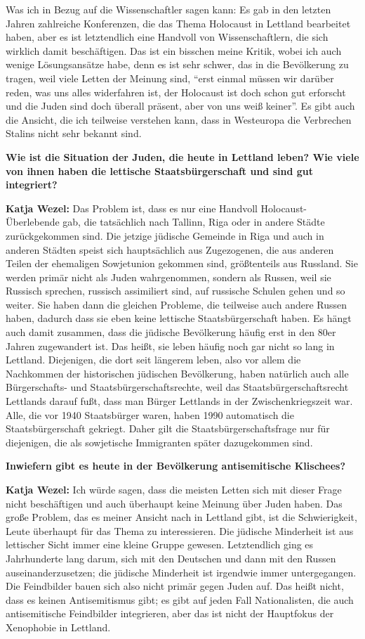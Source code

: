 Was ich in Bezug auf die Wissenschaftler sagen kann: Es gab in den letzten Jahren zahlreiche Konferenzen, die das Thema Holocaust in Lettland bearbeitet haben, aber es ist letztendlich eine Handvoll von Wissenschaftlern, die sich wirklich damit beschäftigen. Das ist ein bisschen meine Kritik, wobei ich auch wenige Lösungsansätze habe, denn es ist sehr schwer, das in die Bevölkerung zu tragen, weil viele Letten der Meinung sind, ``erst einmal müssen wir darüber reden, was uns alles widerfahren ist, der Holocaust ist doch schon gut erforscht und die Juden sind doch überall präsent, aber von uns weiß keiner''. Es gibt auch die Ansicht, die ich teilweise verstehen kann, dass in Westeuropa die Verbrechen Stalins nicht sehr bekannt sind. 

\textbf{Wie ist die Situation der Juden, die heute in Lettland leben? Wie viele von ihnen haben die lettische Staatsbürgerschaft und sind gut integriert?} 

\textbf{Katja Wezel:} Das Problem ist, dass es nur eine Handvoll Holocaust-Überlebende gab, die tatsächlich nach Tallinn, Riga oder in andere Städte zurückgekommen sind. Die jetzige jüdische Gemeinde in Riga und auch in anderen Städten speist sich hauptsächlich aus Zugezogenen, die aus anderen Teilen der ehemaligen Sowjetunion gekommen sind, größtenteils aus Russland. Sie werden primär nicht als Juden wahrgenommen, sondern als Russen, weil sie Russisch sprechen, russisch assimiliert sind, auf russische Schulen gehen und so weiter. Sie haben dann die gleichen Probleme, die teilweise auch andere Russen haben, dadurch dass sie eben keine lettische Staatsbürgerschaft haben. Es hängt auch damit zusammen, dass die jüdische Bevölkerung häufig erst in den 80er Jahren zugewandert ist. Das heißt, sie leben häufig noch gar nicht so lang in Lettland. Diejenigen, die dort seit längerem leben, also vor allem die Nachkommen der historischen jüdischen Bevölkerung, haben natürlich auch alle Bürgerschafts- und Staatsbürgerschaftsrechte, weil das Staatsbürgerschaftsrecht Lettlands darauf fußt, dass man Bürger Lettlands in der Zwischenkriegszeit war. Alle, die vor 1940 Staatsbürger waren, haben 1990 automatisch die Staatsbürgerschaft gekriegt. Daher gilt die Staatsbürgerschaftsfrage nur für diejenigen, die als sowjetische Immigranten später dazugekommen sind. 

\textbf{Inwiefern gibt es heute in der Bevölkerung antisemitische Klischees?} 

\textbf{Katja Wezel:} Ich würde sagen, dass die meisten Letten sich mit dieser Frage nicht beschäftigen und auch überhaupt keine Meinung über Juden haben. Das große Problem, das es meiner Ansicht nach in Lettland gibt, ist die Schwierigkeit, Leute überhaupt für das Thema zu interessieren. Die jüdische Minderheit ist aus lettischer Sicht immer eine kleine Gruppe gewesen. Letztendlich ging es Jahrhunderte lang darum, sich mit den Deutschen und dann mit den Russen auseinanderzusetzen; die jüdische Minderheit ist irgendwie immer untergegangen. Die Feindbilder bauen sich also nicht primär gegen Juden auf. Das heißt nicht, dass es keinen Antisemitismus gibt; es gibt auf jeden Fall Nationalisten, die auch antisemitische Feindbilder integrieren, aber das ist nicht der Hauptfokus der Xenophobie in Lettland. 

